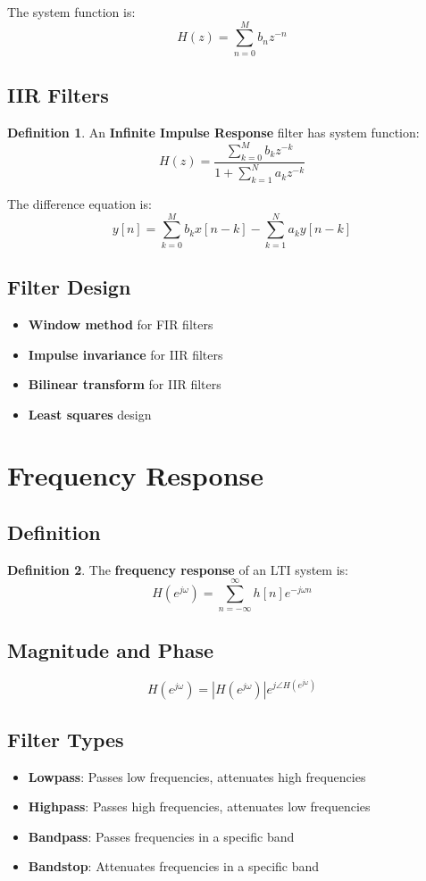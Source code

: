 \documentclass[11pt]{article}
\theoremstyle{definition}
\newtheorem{definition}{Definition}[section]
\begin{document}
The system function is:
$$H(z) = \sum_{n=0}^{M} b_n z^{-n}$$

\subsection{IIR Filters}
\begin{definition}
An \textbf{Infinite Impulse Response} filter has system function:
$$H(z) = \frac{\sum_{k=0}^{M} b_k z^{-k}}{1 + \sum_{k=1}^{N} a_k z^{-k}}$$
\end{definition}

The difference equation is:
$$y[n] = \sum_{k=0}^{M} b_k x[n-k] - \sum_{k=1}^{N} a_k y[n-k]$$

\subsection{Filter Design}
\begin{itemize}
    \item \textbf{Window method} for FIR filters
    \item \textbf{Impulse invariance} for IIR filters
    \item \textbf{Bilinear transform} for IIR filters
    \item \textbf{Least squares} design
\end{itemize}

\section{Frequency Response}

\subsection{Definition}
\begin{definition}
The \textbf{frequency response} of an LTI system is:
$$H(e^{j\omega}) = \sum_{n=-\infty}^{\infty} h[n] e^{-j\omega n}$$
\end{definition}

\subsection{Magnitude and Phase}
$$H(e^{j\omega}) = |H(e^{j\omega})| e^{j\angle H(e^{j\omega})}$$

\subsection{Filter Types}
\begin{itemize}
    \item \textbf{Lowpass}: Passes low frequencies, attenuates high frequencies
    \item \textbf{Highpass}: Passes high frequencies, attenuates low frequencies
    \item \textbf{Bandpass}: Passes frequencies in a specific band
    \item \textbf{Bandstop}: Attenuates frequencies in a specific band
\end{itemize}
\end{document}
